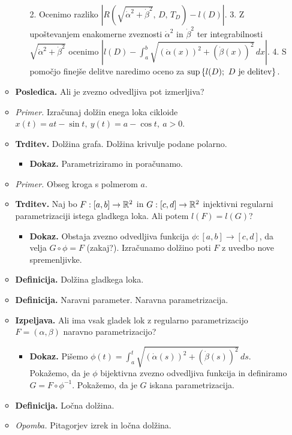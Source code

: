 \begin{enumerate}
\begin{itemize}
\begin{itemize}
            2. Ocenimo razliko $|R(\sqrt{\dot{\alpha}^2 + \dot{\beta}^2}, \, D, \, T_D) - l(D)|$.
            3. Z upoštevanjem enakomerne zveznosti $\dot{\alpha}^2$ in $\dot{\beta}^2$ ter integrabilnosti $\sqrt{\dot{\alpha}^2 + \dot{\beta}^2}$ ocenimo             
            $|l(D) - \int_{a}^{b} \sqrt{(\dot{\alpha}(x))^2 + (\dot{\beta}(x))^2} \, dx|$.
            4. S pomočjo finejše delitve naredimo oceno za $\sup \left\{l(D); \ D \text{ je delitev}\right\}.$
        \end{itemize}
        \item \colorbox{orange!30}{\textbf{Posledica.}} Ali je zvezno odvedljiva pot izmerljiva?
        \item \colorbox{yellow!30}{\emph{Primer.}} Izračunaj dolžin enega loka cikloide $x(t) = at - \sin t, \ y(t) = a - \cos t, \ a > 0$.
        \item \colorbox{blue!30}{\textbf{Trditev.}} Dolžina grafa. Dolžina krivulje podane polarno.
        \begin{itemize}
            \item \colorbox{green!30}{\textbf{Dokaz.}} Parametriziramo in poračunamo.
        \end{itemize}
        \item \colorbox{yellow!30}{\emph{Primer.}} Obseg kroga s polmerom $a$.
        \item \colorbox{blue!30}{\textbf{Trditev.}} Naj bo $F: [a,b] \to \mathbb{R}^2$ in $G: [c,d] \to \mathbb{R}^2$ injektivni regularni parametrizaciji istega gladkega loka. Ali potem $l(F) = l(G)$?
        \begin{itemize}
            \item \colorbox{green!30}{\textbf{Dokaz.}} Obstaja zvezno odvedljiva funkcija $\phi: [a,b] \to [c,d]$, da velja $G \circ \phi = F$ (zakaj?).            
            Izračunamo dolžino poti $F$ z uvedbo nove spremenljivke.
        \end{itemize}
        \item \colorbox{purple!30}{\textbf{Definicija.}} Dolžina gladkega loka.
        \item \colorbox{purple!30}{\textbf{Definicija.}} Naravni parameter. Naravna parametrizacija.
        \item \colorbox{blue!30}{\textbf{Izpeljava.}} Ali ima vsak gladek lok z regularno parametrizacijo $F=(\alpha, \beta)$ naravno parametrizacijo?
        \begin{itemize}
            \item \colorbox{green!30}{\textbf{Dokaz.}} Pišemo $\phi(t) = \int_{a}^{t} \sqrt{(\dot{\alpha}(s))^2 + (\dot{\beta}(s))^2} \, ds$. Pokažemo, da je $\phi$ bijektivna zvezno odvedljiva funkcija in definiramo $G = F \circ \phi^{-1}$. Pokažemo, da je $G$ iskana parametrizacija.
        \end{itemize}
        \item \colorbox{purple!30}{\textbf{Definicija.}} Ločna dolžina.
        \item \colorbox{yellow!30}{\emph{Opomba.}} Pitagorjev izrek in ločna dolžina.
    \end{itemize}


\end{enumerate}

